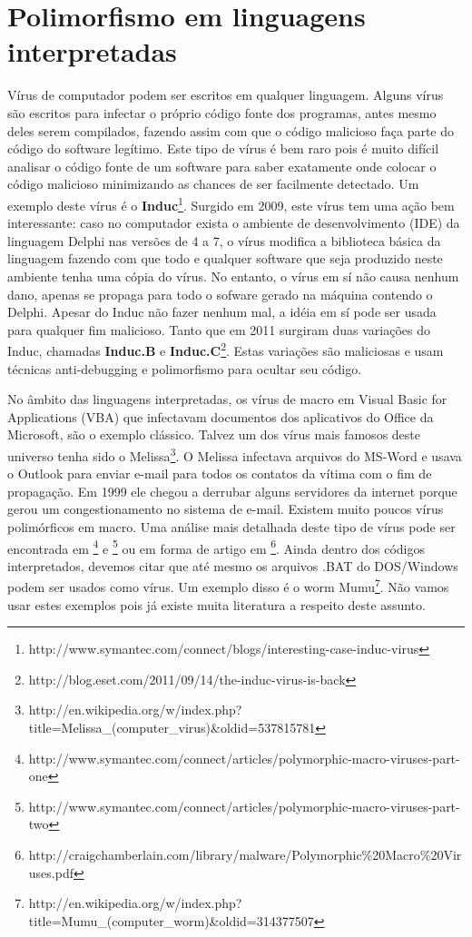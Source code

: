 \section{Polimorfismo em linguagens interpretadas}

Vírus de computador podem ser escritos em qualquer linguagem. Alguns vírus são escritos para infectar o próprio código fonte dos programas, antes mesmo deles serem compilados, fazendo assim com que o código malicioso faça parte do código do software legítimo. Este tipo de vírus é bem raro pois é muito difícil analisar o código fonte de um software para saber exatamente onde colocar o código malicioso minimizando as chances de ser facilmente detectado. Um exemplo deste vírus é o \textbf{Induc}\footnote{http://www.symantec.com/connect/blogs/interesting-case-induc-virus}. Surgido em 2009, este vírus tem uma ação bem interessante: caso no computador exista o ambiente de desenvolvimento (IDE) da linguagem Delphi\textsuperscript{\textregistered} nas versões de 4 a 7, o vírus modifica a biblioteca básica da linguagem fazendo com que todo e qualquer software que seja produzido neste ambiente tenha uma cópia do vírus. No entanto, o vírus em sí não causa nenhum dano, apenas se propaga para todo o sofware gerado na máquina contendo o Delphi. Apesar do Induc não fazer nenhum mal, a idéia em sí pode ser usada para qualquer fim malicioso. Tanto que em 2011 surgiram duas variações do Induc, chamadas \textbf{Induc.B} e \textbf{Induc.C}\footnote{http://blog.eset.com/2011/09/14/the-induc-virus-is-back}. Estas variações são maliciosas e usam técnicas anti-debugging e polimorfismo para ocultar seu código.

No âmbito das linguagens interpretadas, os vírus de macro em Visual Basic for Applications (VBA) que infectavam documentos dos aplicativos do Office da Microsoft, são o exemplo clássico. Talvez um dos vírus mais famosos deste universo tenha sido o Melissa\footnote{http://en.wikipedia.org/w/index.php?title=Melissa\_(computer\_virus)\&oldid=537815781}. O Melissa infectava arquivos do MS-Word e usava o Outlook para enviar e-mail para todos os contatos da vítima com o fim de propagação. Em 1999 ele chegou a derrubar alguns servidores da internet porque gerou um congestionamento no sistema de e-mail. Existem muito poucos vírus polimórficos em macro. Uma análise mais detalhada deste tipo de vírus pode ser encontrada em \footnote{http://www.symantec.com/connect/articles/polymorphic-macro-viruses-part-one} e \footnote{http://www.symantec.com/connect/articles/polymorphic-macro-viruses-part-two} ou em forma de artigo em \footnote{http://craigchamberlain.com/library/malware/Polymorphic\%20Macro\%20Viruses.pdf}. Ainda dentro dos códigos interpretados, devemos citar que até mesmo os arquivos .BAT do DOS/Windows podem ser usados como vírus. Um exemplo disso é o worm Mumu\footnote{http://en.wikipedia.org/w/index.php?title=Mumu\_(computer\_worm)\&oldid=314377507}. Não vamos usar estes exemplos pois já existe muita literatura a respeito deste assunto. 

